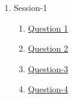 \clearpage
\renewcommand{\notetitle}{Table of Contents}
\label{toc}
\begin{enumerate}

\item Session-1
\begin{enumerate}
\item \hyperref[202501120904]{Question 1}
\item \hyperref[202501121340]{Question 2}
\item \hyperref[202501121522]{Question-3}
\item \hyperref[202501121636]{Question-4}
\end{enumerate}
\end{enumerate}

\newpage
